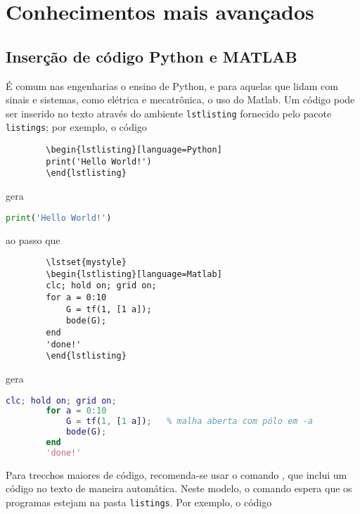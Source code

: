 \section{Conhecimentos mais avançados}
    \subsection{Inserção de código Python e MATLAB}
        É comum nas engenharias o ensino de Python, e para aquelas que lidam com sinais e sistemas,
        como elétrica e mecatrônica, o uso do Matlab.
        Um código pode ser inserido no texto através do ambiente {\tt lstlisting} fornecido pelo pacote {\tt listings};
        por exemplo, o código 
        \begin{verbatim}
        \begin{lstlisting}[language=Python]
        print('Hello World!')
        \end{lstlisting}
        \end{verbatim}

        gera
        \begin{lstlisting}[language=Python]
        print('Hello World!')
        \end{lstlisting}

        ao passo que 
        \begin{verbatim}
        \lstset{mystyle}
        \begin{lstlisting}[language=Matlab]
        clc; hold on; grid on;
        for a = 0:10
            G = tf(1, [1 a]);
            bode(G);
        end
        'done!'
        \end{lstlisting}
        \end{verbatim}

        gera
        \begin{lstlisting}[language=Matlab]
        clc; hold on; grid on;
        for a = 0:10
            G = tf(1, [1 a]);   % malha aberta com pólo em -a
            bode(G);
        end
        'done!'
        \end{lstlisting}

        Para trecchos maiores de código, recomenda-se usar o comando \verb||, 
        que inclui um código no texto de maneira automática.
        Neste modelo, o comando espera que os programas estejam na pasta {\tt listings}.
        Por exemplo, o código
        \begin{verbatim}
        
        \end{verbatim}

